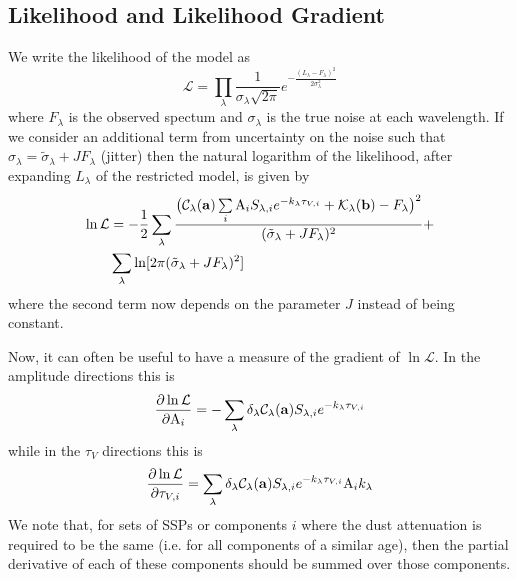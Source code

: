 \documentclass{emulateapj}
\begin{document}
\subsection{Likelihood and Likelihood Gradient}

We write the likelihood of the model as 
\begin{equation}
\mathcal{L} = \prod\limits_\lambda \frac{1}{\sigma_\lambda\sqrt{2\pi}} e^{-\frac{(L_\lambda - F_\lambda)^2}{2\sigma_\lambda^2}}
\end{equation}
where $F_\lambda$ is the observed spectum and $\sigma_\lambda $ is the true noise at each wavelength. If we consider an additional term from uncertainty on the noise such that $\sigma_\lambda = \tilde{\sigma}_\lambda + J F_\lambda$ (jitter) then the natural logarithm of the likelihood, after expanding $L_\lambda$ of the restricted model, is given by
\begin{equation}
\begin{split}
\ln \mathcal{L}  & = -\frac{1}{2} \sum\limits_\lambda \frac{ \big ( \mathcal{C}_\lambda({\bf a})\sum\limits_i \text{A}_i S_{\lambda,i} e^{-k_\lambda\tau_{V,i}} +\mathcal{K}_\lambda({\bf b}) - F_\lambda\big )^2}{(\tilde{\sigma}_\lambda +J F_\lambda)^2}  + \\
& \sum\limits_\lambda\ln [2\pi(\tilde{\sigma}_\lambda +J F_\lambda)^2]
\end{split}
\end{equation}
where the second term now depends on the parameter $J$ instead of being constant.


Now, it can often be useful to have a measure of the gradient of $\ln\mathcal{L}$.  In the amplitude directions this is
\begin{equation}
\frac{\partial \ln\mathcal{L}}{\partial \text{A}_i} = -\sum\limits_\lambda  \delta_\lambda\mathcal{C}_\lambda({\bf a}) S_{\lambda,i} e^{-k_\lambda\tau_{V,i}} 
\end{equation}
while in the $\tau_{V}$ directions this is
\begin{equation}
\frac{\partial \ln\mathcal{L}}{\partial \tau_{V,i}} = \sum\limits_\lambda \delta_\lambda \mathcal{C}_\lambda({\bf a}) S_{\lambda,i} e^{-k_\lambda\tau_{V,i}} \text{A}_i k_\lambda 
\end{equation}
We note that, for sets of SSPs or components $i$ where the dust attenuation is required to be the same (i.e. for all components of a similar age), then the partial derivative of each of these components should be summed over those components.
\end{document}
